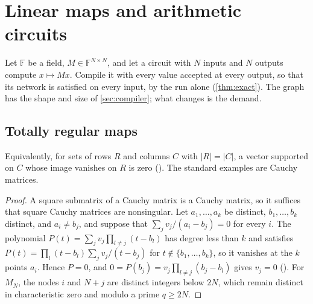 \documentclass[11pt]{article}
\newcommand{\leanrefs}[1]{{\unskip\nobreak\hfil\penalty50\hskip1em\null\nobreak\hfil
  {\normalfont\small #1}\parfillskip=0pt\finalhyphendemerits=0\par}}
\newcommand{\leanref}[1]{\leanrefs{\lean{#1}}}
\theoremstyle{plain}
\theoremstyle{definition}
\theoremstyle{remark}
\newcommand{\F}{\mathbb{F}}
\newcommand{\Z}{\mathbb{Z}}
\newcommand{\card}[1]{\lvert #1\rvert}
\begin{document}
\section{Linear maps and arithmetic circuits}
\label{sec:linear}

Let $\F$ be a field, $M \in \F^{N \times N}$, and let a circuit with $N$ inputs and $N$ outputs
compute $x \mapsto Mx$. Compile it with every value accepted at every output, so that its
network is satisfied on every input, by the run alone (\cref{thm:exact}). The graph has the
shape and size of \cref{sec:compiler}; what changes is the demand.

\subsection{Totally regular maps}


Equivalently, for sets of rows $R$ and columns $C$ with $\card R = \card C$, a vector supported
on $C$ whose image vanishes on $R$ is zero (). The
standard examples are Cauchy matrices.


\begin{proof}
A square submatrix of a Cauchy matrix is a Cauchy matrix, so it suffices that square Cauchy
matrices are nonsingular. Let $a_1, \dots, a_k$ be distinct, $b_1, \dots, b_k$ distinct, and
$a_i \ne b_j$, and suppose that $\sum_j v_j/(a_i - b_j) = 0$ for every $i$. The polynomial
$P(t) = \sum_j v_j \prod_{l \ne j}(t - b_l)$ has degree less than $k$ and satisfies
$P(t) = \prod_l (t - b_l)\sum_j v_j/(t - b_j)$ for $t \notin \{b_1, \dots, b_k\}$, so it vanishes at
the $k$ points $a_i$. Hence $P = 0$, and $0 = P(b_j) = v_j\prod_{l \ne j}(b_j - b_l)$ gives
$v_j = 0$ (). For $M_N$, the nodes $i$ and $N + j$ are distinct
integers below $2N$, which remain distinct in characteristic zero and modulo a prime $q \ge 2N$.
\end{proof}
\end{document}
